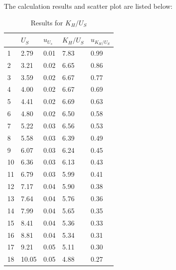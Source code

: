 \documentclass[12pt, a4paper]{article}
\begin{document}
The calculation results and scatter plot are listed below:
\begin{table}[H]
	\begin{center}
	\begin{tabular}{|l|l|l|l|l|}
	\hline
	   & $U_S$ & $u_{U_s}$ & $K_H/U_S$ & $u_{K_H/U_S}$ \\ \hline
	1  & 2.79  & 0.01      & 7.83      & 0.99          \\ \hline
	2  & 3.21  & 0.02      & 6.65      & 0.86          \\ \hline
	3  & 3.59  & 0.02      & 6.67      & 0.77          \\ \hline
	4  & 4.00  & 0.02      & 6.67      & 0.69          \\ \hline
	5  & 4.41  & 0.02      & 6.69      & 0.63          \\ \hline
	6  & 4.80  & 0.02      & 6.50      & 0.58          \\ \hline
	7  & 5.22  & 0.03      & 6.56      & 0.53          \\ \hline
	8  & 5.58  & 0.03      & 6.39      & 0.49          \\ \hline
	9  & 6.07  & 0.03      & 6.24      & 0.45          \\ \hline
	10 & 6.36  & 0.03      & 6.13      & 0.43          \\ \hline
	11 & 6.79  & 0.03      & 5.99      & 0.41          \\ \hline
	12 & 7.17  & 0.04      & 5.90      & 0.38          \\ \hline
	13 & 7.64  & 0.04      & 5.76      & 0.36          \\ \hline
	14 & 7.99  & 0.04      & 5.65      & 0.35          \\ \hline
	15 & 8.41  & 0.04      & 5.36      & 0.33          \\ \hline
	16 & 8.81  & 0.04      & 5.34      & 0.31          \\ \hline
	17 & 9.21  & 0.05      & 5.11      & 0.30          \\ \hline
	18 & 10.05 & 0.05      & 4.88      & 0.27          \\ \hline
	\end{tabular}
	\caption{Results for $K_H/U_S$}	
	\end{center}
\end{table}
	
\end{document}
